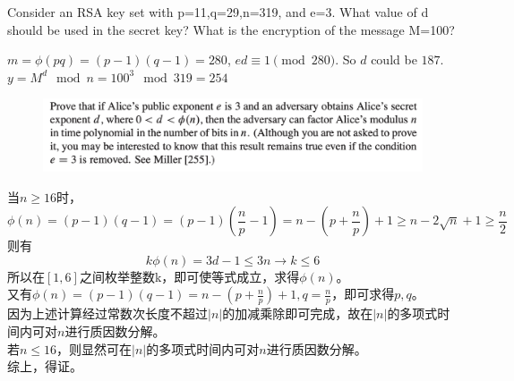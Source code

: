 \documentclass[a4paper, justified]{tufte-handout}
\begin{document}
\begin{problem}[TC 31.7-1]
Consider an RSA key set with p=11,q=29,n=319, and e=3. What value of d should be used in the secret key? What is the encryption of the message M=100?
\end{problem}

\begin{solution}
$m=\phi(pq)=(p - 1)(q-1)=280$, $ed\equiv 1\pmod{280}$. So $d$ could be $187$.\\
$y = M^{d} \mod n= 100^{3}\mod 319 =254$
\end{solution}

\begin{problem}[TC 31.7-2]
 \begin{figure}[htbp]
    \centering
    \includegraphics[width = 0.90\linewidth]{figs/a}
  \end{figure}
\end{problem}

\begin{solution}
当$n\geq 16$时，
\[
\phi(n)=(p-1)(q-1)=(p-1)(\frac{n}{p}-1)=n - (p + \frac{n}{p}) + 1 \geq n - 2\sqrt{n} + 1\geq \frac{n}{2}
\]
则有
\[
k \phi(n) = 3d-1 \leq 3n\to k \leq 6
\]
所以在$[1,6]$之间枚举整数k，即可使等式成立，求得$\phi(n)$。\\
又有$\phi(n)=(p-1)(q-1)=n - (p + \frac{n}{p}) + 1, q = \frac{n}{p}$，即可求得$p,q$。\\
因为上述计算经过常数次长度不超过$|n|$的加减乘除即可完成，故在$|n|$的多项式时间内可对$n$进行质因数分解。\\
若$n\leq 16$，则显然可在$|n|$的多项式时间内可对$n$进行质因数分解。\\
综上，得证。
\end{solution}

\begin{problem}[TC Problem 31-3]
\end{problem}
\end{document}
